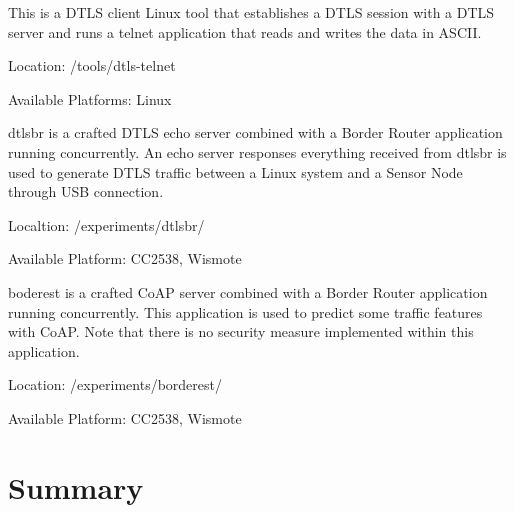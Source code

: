 \begin{description}[style=nextline]

\item[dtls-telnet]
This is a DTLS client Linux tool that establishes a DTLS session with a DTLS server and runs a telnet application that reads and writes the data in ASCII. 

Location: /tools/dtls-telnet

Available Platforms: Linux

\item[dtlsbr]
dtlsbr is a crafted DTLS echo server combined with a Border Router application running concurrently. An echo server responses everything received from  dtlsbr is used to generate DTLS traffic between a Linux system and a Sensor Node through USB connection.

Localtion: /experiments/dtlsbr/

Available Platform: CC2538, Wismote

\item[borderest]
boderest is a crafted CoAP server combined with a Border Router application running concurrently. This application is used to predict some traffic features with CoAP. Note that there is no security measure implemented within this application.

Location: /experiments/borderest/

Available Platform: CC2538, Wismote

\item[keydtls]





\end{description}

\section{Summary}



